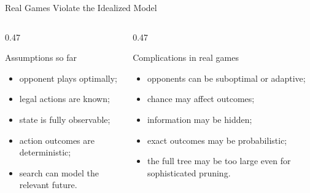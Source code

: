 \documentclass[aspectratio=169,10pt]{beamer}
\begin{document}
\begin{frame}[shrink=18]{Real Games Violate the Idealized Model}

  \begin{columns}[T,onlytextwidth]

    \begin{column}{0.47\textwidth}

      \begin{block}{Assumptions so far}

        \begin{itemize}

          \item opponent plays optimally;

          \item legal actions are known;

          \item state is fully observable;

          \item action outcomes are deterministic;

          \item search can model the relevant future.

        \end{itemize}

      \end{block}

    \end{column}

    \begin{column}{0.47\textwidth}

      \begin{block}{Complications in real games}

        \begin{itemize}

          \item opponents can be suboptimal or adaptive;

          \item chance may affect outcomes;

          \item information may be hidden;

          \item exact outcomes may be probabilistic;

          \item the full tree may be too large even for sophisticated pruning.

        \end{itemize}


\end{block}
\end{column}
\end{columns}
\end{frame}
\end{document}
